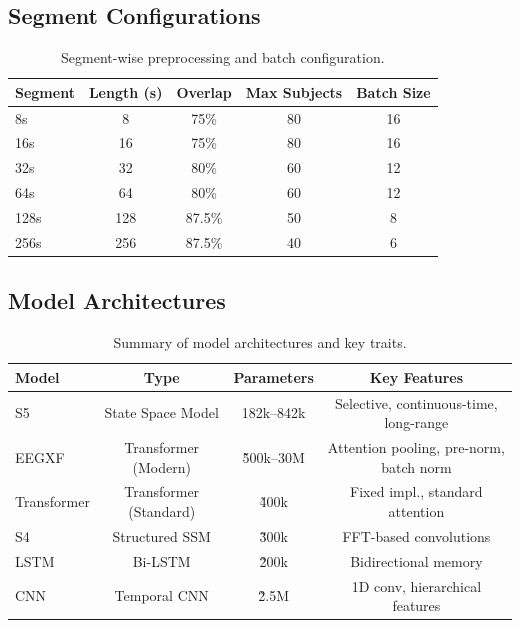 \documentclass{article}
\newcommand{\eegtrans}{EEGXF}
\begin{document}
\subsection{Segment Configurations}
\begin{table}[h]
\centering
\caption{Segment-wise preprocessing and batch configuration.}
\begin{tabular}{lcccc}
\toprule
\textbf{Segment} & \textbf{Length (s)} & \textbf{Overlap} & \textbf{Max Subjects} & \textbf{Batch Size} \\
\midrule
8s & 8 & 75\% & 80 & 16 \\
16s & 16 & 75\% & 80 & 16 \\
32s & 32 & 80\% & 60 & 12 \\
64s & 64 & 80\% & 60 & 12 \\
128s & 128 & 87.5\% & 50 & 8 \\
256s & 256 & 87.5\% & 40 & 6 \\
\bottomrule
\end{tabular}
\label{tab:segment_config}
\end{table}

\subsection{Model Architectures}
\begin{table}[h]
\centering
\caption{Summary of model architectures and key traits.}
\begin{tabular}{lccc}
\toprule
\textbf{Model} & \textbf{Type} & \textbf{Parameters} & \textbf{Key Features} \\
\midrule
S5 & State Space Model & 182k--842k & Selective, continuous-time, long-range \\
\eegtrans & Transformer (Modern) & \~500k--30M & Attention pooling, pre-norm, batch norm \\
Transformer & Transformer (Standard) & \~400k & Fixed impl., standard attention \\
S4 & Structured SSM & \~300k & FFT-based convolutions \\
LSTM & Bi-LSTM & \~200k & Bidirectional memory \\
CNN & Temporal CNN & \~2.5M & 1D conv, hierarchical features \\
\bottomrule
\end{tabular}
\label{tab:model_arch}
\end{table}
\end{document}
